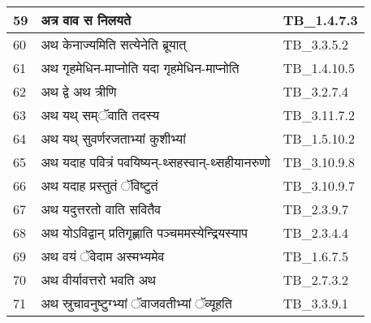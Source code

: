 \documentclass[17pt]{extarticle}
\begin{document}
\begin{longtable}{||p{0.4in}||p{4.9in}||p{0.9in}||}
    59 & अत्र वाव स निलयते & TB\_1.4.7.3       \\
    
    \hline
        
    60 & अथ केनाज्यमिति सत्येनेति ब्रूयात् & TB\_3.3.5.2       \\
    
    \hline
        
    61 & अथ गृहमेधिन{-}माप्नोति यदा गृहमेधिन{-}माप्नोति & TB\_1.4.10.5       \\
    
    \hline
        
    62 & अथ द्वे अथ त्रीणि & TB\_3.2.7.4       \\
    
    \hline
        
    63 & अथ यथ् सम्ॅवाति तदस्य & TB\_3.11.7.2       \\
    
    \hline
        
    64 & अथ यथ् सुवर्णरजताभ्यां कुशीभ्यां & TB\_1.5.10.2       \\
    
    \hline
        
    65 & अथ यदाह पवित्रं पवयिष्यन्{-}थ्सहस्वान्{-}थ्सहीयानरुणो & TB\_3.10.9.8       \\
    
    \hline
        
    66 & अथ यदाह प्रस्तुतं ॅविष्टुतं & TB\_3.10.9.7       \\
    
    \hline
        
    67 & अथ यदुत्तरतो वाति सवितैव & TB\_2.3.9.7       \\
    
    \hline
        
    68 & अथ योऽविद्वान् प्रतिगृह्णाति पञ्चममस्येन्द्रियस्याप & TB\_2.3.4.4       \\
    
    \hline
        
    69 & अथ वयं ॅवेदाम अस्मभ्यमेव & TB\_1.6.7.5       \\
    
    \hline
        
    70 & अथ वीर्यावत्तरो भवति अथ & TB\_2.7.3.2       \\
    
    \hline
        
    71 & अथ स्रुचावनुष्टुग्भ्यां ॅवाजवतीभ्यां ॅव्यूहति & TB\_3.3.9.1       \\
    

\end{longtable}
\end{document}
